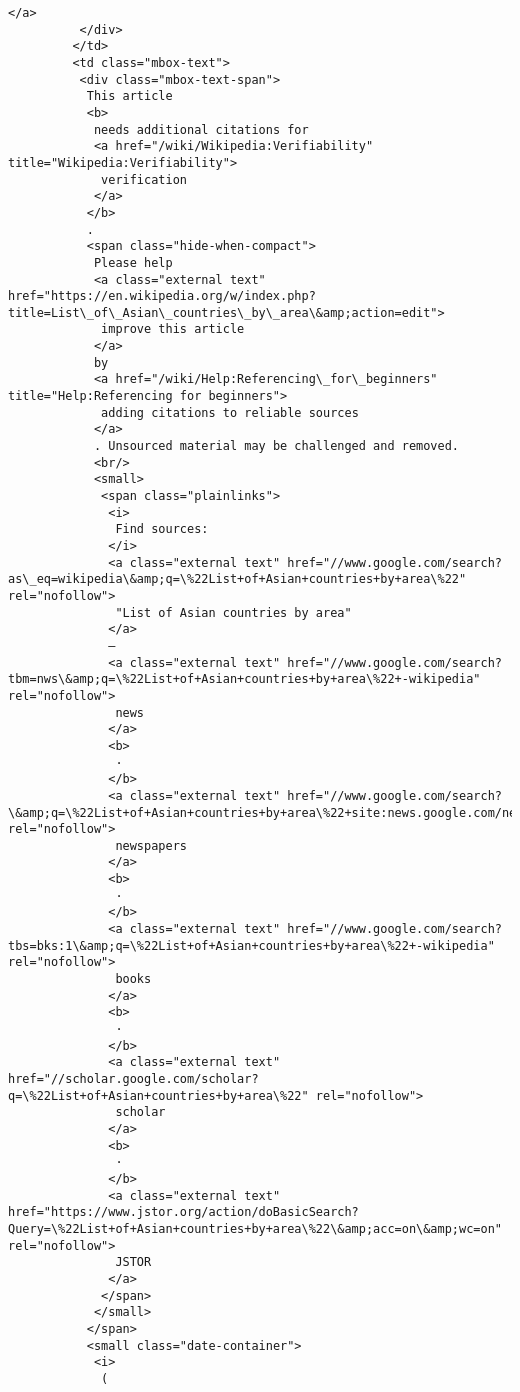 \documentclass[11pt]{article}
\begin{document}
\begin{Verbatim}[commandchars=\\\{\}]
           </a>
          </div>
         </td>
         <td class="mbox-text">
          <div class="mbox-text-span">
           This article
           <b>
            needs additional citations for
            <a href="/wiki/Wikipedia:Verifiability" title="Wikipedia:Verifiability">
             verification
            </a>
           </b>
           .
           <span class="hide-when-compact">
            Please help
            <a class="external text" href="https://en.wikipedia.org/w/index.php?title=List\_of\_Asian\_countries\_by\_area\&amp;action=edit">
             improve this article
            </a>
            by
            <a href="/wiki/Help:Referencing\_for\_beginners" title="Help:Referencing for beginners">
             adding citations to reliable sources
            </a>
            . Unsourced material may be challenged and removed.
            <br/>
            <small>
             <span class="plainlinks">
              <i>
               Find sources:
              </i>
              <a class="external text" href="//www.google.com/search?as\_eq=wikipedia\&amp;q=\%22List+of+Asian+countries+by+area\%22" rel="nofollow">
               "List of Asian countries by area"
              </a>
              –
              <a class="external text" href="//www.google.com/search?tbm=nws\&amp;q=\%22List+of+Asian+countries+by+area\%22+-wikipedia" rel="nofollow">
               news
              </a>
              <b>
               ·
              </b>
              <a class="external text" href="//www.google.com/search?\&amp;q=\%22List+of+Asian+countries+by+area\%22+site:news.google.com/newspapers\&amp;source=newspapers" rel="nofollow">
               newspapers
              </a>
              <b>
               ·
              </b>
              <a class="external text" href="//www.google.com/search?tbs=bks:1\&amp;q=\%22List+of+Asian+countries+by+area\%22+-wikipedia" rel="nofollow">
               books
              </a>
              <b>
               ·
              </b>
              <a class="external text" href="//scholar.google.com/scholar?q=\%22List+of+Asian+countries+by+area\%22" rel="nofollow">
               scholar
              </a>
              <b>
               ·
              </b>
              <a class="external text" href="https://www.jstor.org/action/doBasicSearch?Query=\%22List+of+Asian+countries+by+area\%22\&amp;acc=on\&amp;wc=on" rel="nofollow">
               JSTOR
              </a>
             </span>
            </small>
           </span>
           <small class="date-container">
            <i>
             (

\end{Verbatim}
\end{document}
